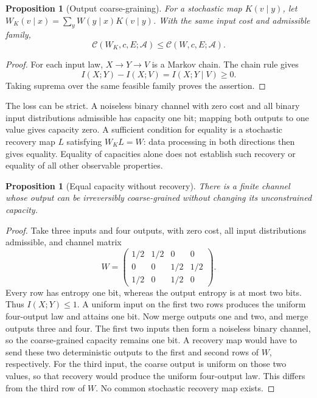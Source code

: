 \documentclass{article}
\newtheorem{proposition}[theorem]{Proposition}
\begin{document}
\begin{proposition}[Output coarse-graining]
For a stochastic map \(K(v\mid y)\), let \(W_K(v\mid x)=\sum_yW(y\mid x)K(v\mid y)\). With the same input cost and admissible family,
\[
\mathcal C(W_K,c,E;\mathcal A)
\le\mathcal C(W,c,E;\mathcal A).
\]
\end{proposition}
\begin{proof}
For each input law, \(X\to Y\to V\) is a Markov chain. The chain rule gives
\[
I(X;Y)-I(X;V)=I(X;Y\mid V)\ge0.
\]
Taking suprema over the same feasible family proves the assertion.
\end{proof}

The loss can be strict. A noiseless binary channel with zero cost and all binary input distributions admissible has capacity one bit; mapping both outputs to one value gives capacity zero. A sufficient condition for equality is a stochastic recovery map \(L\) satisfying \(W_KL=W\): data processing in both directions then gives equality. Equality of capacities alone does not establish such recovery or equality of all other observable properties.

\begin{proposition}[Equal capacity without recovery]
There is a finite channel whose output can be irreversibly coarse-grained without changing its unconstrained capacity.
\end{proposition}
\begin{proof}
Take three inputs and four outputs, with zero cost, all input distributions admissible, and channel matrix
\[
W=\begin{pmatrix}
1/2&1/2&0&0\\
0&0&1/2&1/2\\
1/2&0&1/2&0
\end{pmatrix}.
\]
Every row has entropy one bit, whereas the output entropy is at most two bits. Thus \(I(X;Y)\le1\). A uniform input on the first two rows produces the uniform four-output law and attains one bit. Now merge outputs one and two, and merge outputs three and four. The first two inputs then form a noiseless binary channel, so the coarse-grained capacity remains one bit. A recovery map would have to send these two deterministic outputs to the first and second rows of \(W\), respectively. For the third input, the coarse output is uniform on those two values, so that recovery would produce the uniform four-output law. This differs from the third row of \(W\). No common stochastic recovery map exists.
\end{proof}
\end{document}
